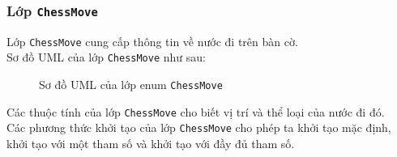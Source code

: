 \subsubsection{Lớp \lstinline{ChessMove}}
Lớp \lstinline{ChessMove} cung cấp thông tin về nước đi trên bàn cờ.\\
Sơ đồ UML của lớp \lstinline{ChessMove} như sau:
\begin{figure}[H]
\caption{Sơ đồ UML của lớp enum \lstinline{ChessMove}}
\end{figure}
Các thuộc tính của lớp \lstinline{ChessMove} cho biết vị trí và thể loại của nước đi đó.\\
Các phương thức khởi tạo của lớp \lstinline{ChessMove} cho phép ta khởi tạo mặc định, khởi tạo với một tham số và khởi tạo với đầy đủ tham số.